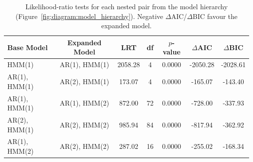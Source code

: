 \begin{table}[ht]
\centering
\begin{tabular}{lcccccc}
\hline
Base Model & Expanded Model & LRT & df & $p$-value & $\Delta$AIC & $\Delta$BIC \\
\hline
HMM(1) & AR(1), HMM(1) & 2058.28 & 4 & 0.0000 & -2050.28 & -2028.61 \\
AR(1), HMM(1) & AR(2), HMM(1) & 173.07 & 4 & 0.0000 & -165.07 & -143.40 \\
AR(1), HMM(1) & AR(1), HMM(2) & 872.00 & 72 & 0.0000 & -728.00 & -337.93 \\
AR(2), HMM(1) & AR(2), HMM(2) & 985.94 & 84 & 0.0000 & -817.94 & -362.92 \\
AR(1), HMM(2) & AR(2), HMM(2) & 287.02 & 16 & 0.0000 & -255.02 & -168.34 \\
\hline
\end{tabular}
\caption{Likelihood-ratio tests for each nested pair from the model hierarchy (Figure~\ref{fig:diagram:model_hierarchy}). Negative $\Delta$AIC/$\Delta$BIC favour the expanded model.}
\label{tab:lrt_comparison}
\end{table}
